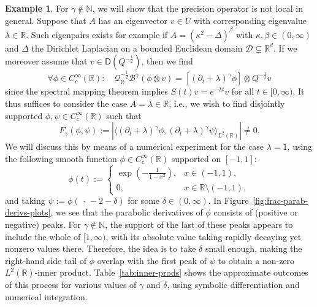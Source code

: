 \documentclass[reqno]{amsart}
\numberwithin{equation}{section}
\newcommand{\bbR}{\mathbb{R}}
\newcommand{\R}{\mathbb{R}}
\newcommand{\N}{\mathbb{N}}
\newcommand{\cB}{\mathcal{B}}
\newcommand{\cD}{\mathcal{D}}
\newcommand{\cQ}{\mathcal{Q}}
\newcommand{\scalar}[2]{     \langle #1       \rangle_{ #2 }}
\newcommand{\dom}[1]{\mathsf D(#1)}
\theoremstyle{remark}
\theoremstyle{definition}
\newtheorem{example}[lemma]{Example}
\begin{document}
\begin{example}
	For $\gamma \not \in \N$, we will show that the precision operator is not local in general.
	Suppose that $A$ has an eigenvector $v \in U$ with corresponding eigenvalue $\lambda \in \R$.
	Such eigenpairs exists for example if $A = (\kappa^2 - \Delta)^\beta$ 
	with $\kappa, \beta \in (0,\infty)$ and $\Delta$ the Dirichlet Laplacian on a bounded Euclidean
	domain $\cD \subsetneq \bbR^d$.
	If we moreover assume that $v \in \dom{Q^{-\frac{1}{2}}}$, then we find
	\begin{equation}
		\forall \phi \in C_c^\infty(\R) : \quad 
		\cQ_{\bbR}^{-\frac{1}{2}} \cB^\gamma (\phi \otimes v) = [(\partial_t + \lambda)^\gamma \phi] \otimes Q^{-\frac{1}{2}}v
	\end{equation}
	since the spectral mapping theorem implies $S(t)v = e^{-\lambda t}v$ for all $t \in [0,\infty)$.
	It thus suffices to consider the case $A = \lambda \in \bbR$, i.e., 
	we wish to find disjointly supported $\phi, \psi \in C_c^\infty(\bbR)$ such that
	\begin{equation}\label{eq:Fgamma}
		F_\gamma(\phi, \psi) :=
		|\scalar{(\partial_t + \lambda)^\gamma \phi, (\partial_t + \lambda)^\gamma \psi}{L^2(\R)}|
		\neq 0.
	\end{equation}
	We will discuss this by means of a numerical experiment for the case $\lambda = 1$,
	using the following smooth function $\phi \in C_c^\infty(\bbR)$ supported on $[-1,1]$:
	\begin{equation}\label{eq:bump}
		\phi(t) := \begin{cases}
			\exp\left(-\frac{1}{1-x^2}\right)\!, &x \in (-1, 1), \\
			0, &x \in \R\setminus (-1,1),
		\end{cases}
	\end{equation}
	and taking $\psi := \phi( \,\cdot\, - 2 - \delta)$ for some $\delta \in (0,\infty)$.
	In Figure~\ref{fig:frac-parab-derivs-plots}, 
	we see that the parabolic derivatives of $\phi$ consists of
	(positive or negative) peaks.
	For $\gamma \not\in \N$, the support of the last of these peaks appears to
	include the whole of $[1,\infty)$,
	with its absolute value
	taking rapidly decaying yet nonzero values there.
	Therefore, the idea is to take $\delta$ small enough,
	making the right-hand side tail of $\phi$ overlap with
	the first peak of $\psi$ to obtain a non-zero $L^2(\bbR)$-inner product.
	Table~\ref{tab:inner-prods} shows the approximate outcomes 
	of this process for various values of $\gamma$ and $\delta$, using symbolic differentiation and 
	numerical integration.
	

\end{example}
\end{document}
